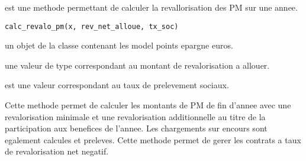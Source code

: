 \documentclass[a4paper]{book}
\begin{document}
%
\begin{Description}\relax
{} est une methode permettant de calculer la revallorisation des PM sur une annee.
\end{Description}
%
\begin{Usage}
\begin{verbatim}
calc_revalo_pm(x, rev_net_alloue, tx_soc)
\end{verbatim}
\end{Usage}
%
\begin{Arguments}
\begin{ldescription}
\item[\code{x}] un objet de la classe  contenant les model points epargne euros.

\item[\code{rev\_net\_alloue}] une valeur de type  correspondant au montant de revalorisation a allouer.

\item[\code{tx\_soc}] est une valeur  correspondant au taux de prelevement sociaux.
\end{ldescription}
\end{Arguments}
%
\begin{Details}\relax
Cette methode permet de calculer les montants de PM de fin d'annee avec une revalorisation
minimale et une revalorisation additionnelle au titre de la participation aux benefices de l'annee.
Les chargements sur encours sont egalement calcules et preleves.
Cette methode permet de gerer les contrats a taux de revalorisation net negatif.
\end{Details}
%
\end{document}
